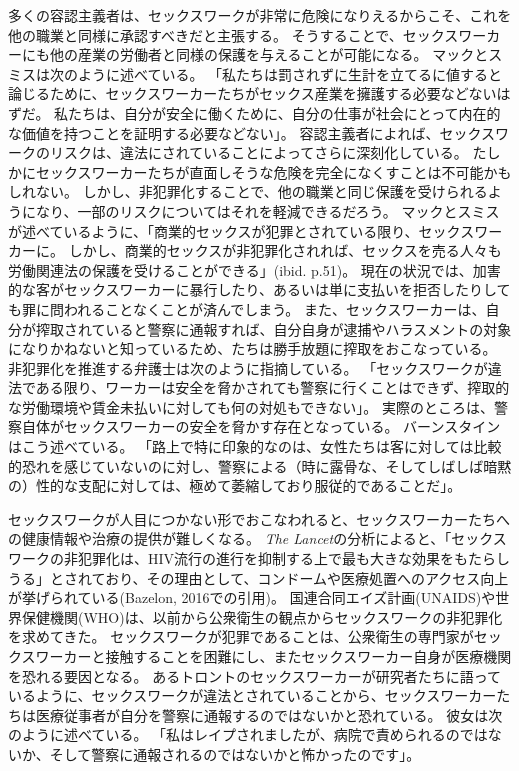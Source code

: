 \documentclass[paper=a4,book,openany]{jlreq}
\newcommand{\ig}[1]{}           %
\begin{document}
多くの容認主義者は、セックスワークが非常に危険になりえるからこそ、これを他の職業と同様に承認すべきだと主張する。
そうすることで、セックスワーカーにも他の産業の労働者と同様の保護を与えることが可能になる。
マックとスミスは次のように述べている。
「私たちは罰されずに生計を立てるに値すると論じるために、セックスワーカーたちがセックス産業を擁護する必要などないはずだ。
私たちは、自分が安全に働くために、自分の仕事が社会にとって内在的な価値を持つことを証明する必要などない」\citep[p.55]{mac18:_revol_prost}。
容認主義者によれば、セックスワークのリスクは、違法にされていることによってさらに深刻化している。
たしかにセックスワーカーたちが直面しそうな危険を完全になくすことは不可能かもしれない。
しかし、非犯罪化することで、他の職業と同じ保護を受けられるようになり、一部のリスクについてはそれを軽減できるだろう。
マックとスミスが述べているように、「商業的セックスが犯罪とされている限り、セックスワーカーに。
しかし、商業的セックスが非犯罪化されれば、セックスを売る人々も労働関連法の保護を受けることができる」(ibid. p.51)。
現在の状況では、加害的な客がセックスワーカーに暴行したり、あるいは単に支払いを拒否したりしても罪に問われることなくことが済んでしまう。
また、セックスワーカーは、自分が搾取されていると警察に通報すれば、自分自身が逮捕やハラスメントの対象になりかねないと知っているため、たちは勝手放題に搾取をおこなっている。
非犯罪化を推進する弁護士は次のように指摘している。
「セックスワークが違法である限り、ワーカーは安全を脅かされても警察に行くことはできず、搾取的な労働環境や賃金未払いに対しても何の対処もできない」\citep{shugerman17:_prost_could_be_legal_calif}。
実際のところは、警察自体がセックスワーカーの安全を脅かす存在となっている。
バーンスタインはこう述べている。
「路上で特に印象的なのは、女性たちは客に対しては比較的恐れを感じていないのに対し、警察による（時に露骨な、そしてしばしば暗黙の）性的な支配に対しては、極めて萎縮しており服従的であることだ」\citep[p.108]{bernstein99:_whats_wrong_prost}。
\ig{Elizabeth Bernstein}

セックスワークが人目につかない形でおこなわれると、セックスワーカーたちへの健康情報や治療の提供が難しくなる。
\emph{The Lancet}の分析によると、「セックスワークの非犯罪化は、HIV流行の進行を抑制する上で最も大きな効果をもたらしうる」とされており、その理由として、コンドームや医療処置へのアクセス向上が挙げられている(Bazelon, 2016での引用)。
\nocite{bazelon16:_shoul_prost_be_crime}
国連合同エイズ計画(UNAIDS)や世界保健機関(WHO)は、以前から公衆衛生の観点からセックスワークの非犯罪化を求めてきた。
セックスワークが犯罪であることは、公衆衛生の専門家がセックスワーカーと接触することを困難にし、またセックスワーカー自身が医療機関を恐れる要因となる。
あるトロントのセックスワーカーが研究者たちに語っているように、セックスワークが違法とされていることから、セックスワーカーたちは医療従事者が自分を警察に通報するのではないかと恐れている。
彼女は次のように述べている。
「私はレイプされましたが、病院で責められるのではないか、そして警察に通報されるのではないかと怖かったのです」\citep{neal14:_street_based_sex_worker_needs_asses}。
\end{document}
